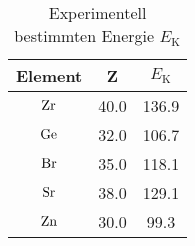 \begin{table} 
\centering 
\caption{Experimentell bestimmten Energie $E_{\mathrm{K}}$} 
\label{tab: ener_ryd} 
\begin{tabular}{S S S} 
\toprule  
{Element} & {Z} & {$E_{\mathrm{K}}$}  \\ 
\midrule  
$\ce{Zr}$& 40.0  & 136.9\\ 
$\ce{Ge}$ & 32.0  & 106.7\\ 
$\ce{Br}$ &35.0  & 118.1\\ 
$\ce{Sr}$ &38.0  & 129.1\\ 
 $\ce{Zn}$ &30.0  & 99.3\\ 
\bottomrule 
\end{tabular} 
\end{table}

